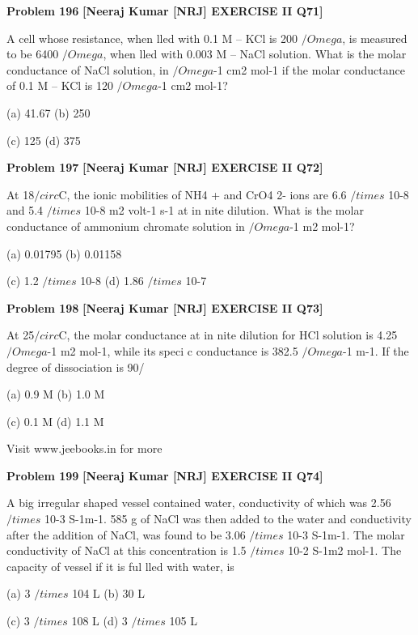 \begin{problembox}
\textbf{Problem 196} \hfill \textbf{[Neeraj Kumar [NRJ] EXERCISE II Q71]}
\label{q:ext-nrj_all_questions-196}

A cell whose resistance, when   lled with 0.1 M 
-- KCl is 200 $/Omega$, is measured to be 6400 $/Omega$, when 
  lled with 0.003 M -- NaCl solution. What is the 
molar conductance of NaCl solution, in $/Omega$-1 cm2 
mol-1 if the molar conductance of 0.1 M -- KCl is 
120 $/Omega$-1 cm2 mol-1?
 
 (a) 41.67 
(b) 250
 
 (c) 125 
(d) 375
\end{problembox}

\begin{problembox}
\textbf{Problem 197} \hfill \textbf{[Neeraj Kumar [NRJ] EXERCISE II Q72]}
\label{q:ext-nrj_all_questions-197}

At 18$/circ$C, the ionic mobilities of NH4
+ and CrO4
2- 
ions are 6.6 $/times$ 10-8 and 5.4 $/times$ 10-8 m2 volt-1 s-1 at 
in  nite dilution. What is the molar conductance 
of ammonium chromate solution in $/Omega$-1 m2 mol-1?
 
 (a) 0.01795 
(b) 0.01158
 
 (c) 1.2 $/times$ 10-8 
(d) 1.86 $/times$ 10-7
\end{problembox}

\begin{problembox}
\textbf{Problem 198} \hfill \textbf{[Neeraj Kumar [NRJ] EXERCISE II Q73]}
\label{q:ext-nrj_all_questions-198}

At 25$/circ$C, the molar conductance at in  nite dilution 
for HCl solution is 4.25 $/Omega$-1 m2 mol-1, while its 
speci  c conductance is 382.5 $/Omega$-1 m-1. If the degree 
of dissociation is 90/%
 
 (a) 0.9 M 
(b) 1.0 M
 
 (c) 0.1 M 
(d) 1.1 M
 
 
Visit www.jeebooks.in for more
\end{problembox}

\begin{problembox}
\textbf{Problem 199} \hfill \textbf{[Neeraj Kumar [NRJ] EXERCISE II Q74]}
\label{q:ext-nrj_all_questions-199}

A big irregular shaped vessel contained water, 
conductivity of which was 2.56 $/times$ 10-3 S-1m-1. 
585 g of NaCl was then added to the water and 
conductivity after the addition of NaCl, was found 
to be 3.06 $/times$ 10-3 S-1m-1. The molar conductivity 
of NaCl at this concentration is 1.5 $/times$ 10-2 S-1m2 
mol-1. The capacity of vessel if it is ful  lled with 
water, is
 
 (a) 3 $/times$ 104 L 
(b) 30 L
 
 (c) 3 $/times$ 108 L 
(d) 3 $/times$ 105 L
\end{problembox}

